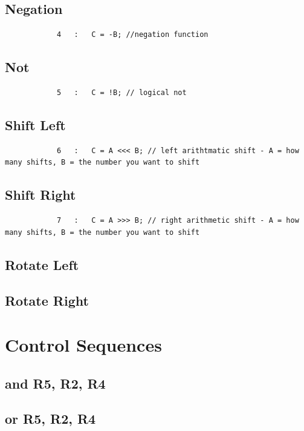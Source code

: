\documentclass{article}
\begin{document}
    \subsection{Negation}
        \begin{lstlisting}
            4   :   C = -B; //negation function
        \end{lstlisting}
    \subsection{Not}
        \begin{lstlisting}
            5   :   C = !B; // logical not 
        \end{lstlisting}
    \subsection{Shift Left}
        \begin{lstlisting}
            6   :   C = A <<< B; // left arithtmatic shift - A = how many shifts, B = the number you want to shift 
        \end{lstlisting}
    \subsection{Shift Right}
        \begin{lstlisting}
            7   :   C = A >>> B; // right arithmetic shift - A = how many shifts, B = the number you want to shift 
        \end{lstlisting}
    \subsection{Rotate Left}
        
    \subsection{Rotate Right}
        
\section{Control Sequences}
    \subsection{and R5, R2, R4} \label{AND}
        
    \subsection{or R5, R2, R4} \label{OR}
        
\end{document}
